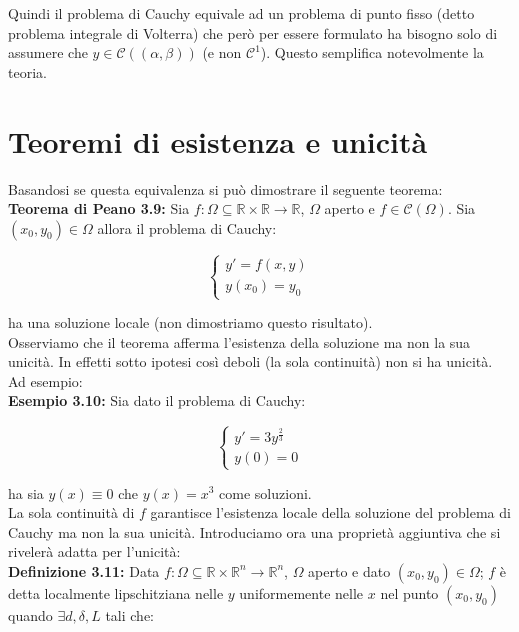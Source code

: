 \documentclass[a4paper,11pt,titlepage]{book}
\begin{document}
Quindi il problema di Cauchy equivale ad un problema di punto fisso (detto problema integrale di Volterra) che però per essere formulato ha bisogno solo di assumere che $y\in\mathcal{C}((\alpha,\beta))$ (e non $\mathcal{C}^1$). Questo semplifica notevolmente la teoria.

\section{Teoremi di esistenza e unicità}


Basandosi se questa equivalenza si può dimostrare il seguente teorema:\\

\textbf{Teorema di Peano 3.9:} Sia $f:\Omega\subseteq\mathbb{R}\times\mathbb{R}\to\mathbb{R}$, $\Omega$ aperto e $f\in\mathcal{C}(\Omega)$. Sia $(x_0,y_0)\in\Omega$ allora il problema di Cauchy: 

$$\begin{cases}
y'=f(x,y)\\
y(x_0)=y_0
\end{cases}$$

ha una soluzione locale (non dimostriamo questo risultato).\\

Osserviamo che il teorema afferma l'esistenza della soluzione ma non la sua unicità. In effetti sotto ipotesi così deboli (la sola continuità) non si ha unicità. Ad esempio:\\

\textbf{Esempio 3.10:} Sia dato il problema di Cauchy:

$$\begin{cases}
y'=3y^{\frac{2}{3}}\\
y(0)=0
\end{cases}$$

ha sia $y(x)\equiv 0$ che $y(x)=x^3$ come soluzioni.\\

La sola continuità di $f$ garantisce l'esistenza locale della soluzione del problema di Cauchy ma non la sua unicità. Introduciamo ora una proprietà aggiuntiva che si rivelerà adatta per l'unicità:\\

\textbf{Definizione 3.11:} Data $f:\Omega\subseteq\mathbb{R}\times\mathbb{R}^n \to\mathbb{R}^n$, $\Omega$ aperto e dato $(x_0,y_0)\in\Omega$; $f$ è detta localmente lipschitziana nelle $y$ uniformemente nelle $x$ nel punto $(x_0,y_0)$ quando $\exists d,\delta,L$ tali che: 
\end{document}
